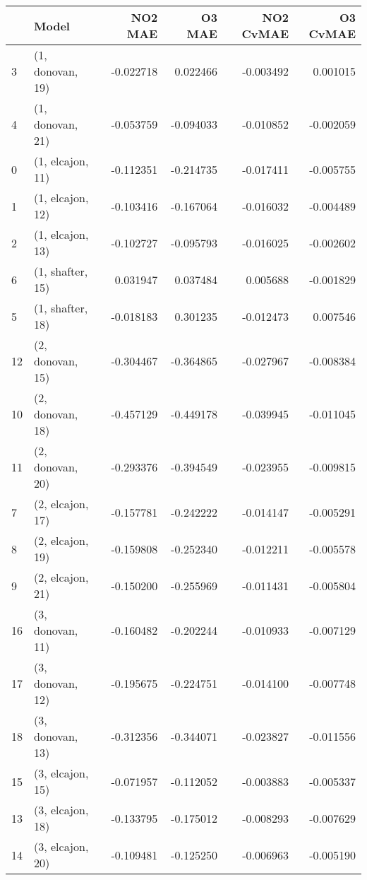\begin{tabular}{llrrrr}
\toprule
{} &             Model &   NO2 MAE &    O3 MAE &  NO2 CvMAE &  O3 CvMAE \\
\midrule
3  &  (1, donovan, 19) & -0.022718 &  0.022466 &  -0.003492 &  0.001015 \\
4  &  (1, donovan, 21) & -0.053759 & -0.094033 &  -0.010852 & -0.002059 \\
0  &  (1, elcajon, 11) & -0.112351 & -0.214735 &  -0.017411 & -0.005755 \\
1  &  (1, elcajon, 12) & -0.103416 & -0.167064 &  -0.016032 & -0.004489 \\
2  &  (1, elcajon, 13) & -0.102727 & -0.095793 &  -0.016025 & -0.002602 \\
6  &  (1, shafter, 15) &  0.031947 &  0.037484 &   0.005688 & -0.001829 \\
5  &  (1, shafter, 18) & -0.018183 &  0.301235 &  -0.012473 &  0.007546 \\
12 &  (2, donovan, 15) & -0.304467 & -0.364865 &  -0.027967 & -0.008384 \\
10 &  (2, donovan, 18) & -0.457129 & -0.449178 &  -0.039945 & -0.011045 \\
11 &  (2, donovan, 20) & -0.293376 & -0.394549 &  -0.023955 & -0.009815 \\
7  &  (2, elcajon, 17) & -0.157781 & -0.242222 &  -0.014147 & -0.005291 \\
8  &  (2, elcajon, 19) & -0.159808 & -0.252340 &  -0.012211 & -0.005578 \\
9  &  (2, elcajon, 21) & -0.150200 & -0.255969 &  -0.011431 & -0.005804 \\
16 &  (3, donovan, 11) & -0.160482 & -0.202244 &  -0.010933 & -0.007129 \\
17 &  (3, donovan, 12) & -0.195675 & -0.224751 &  -0.014100 & -0.007748 \\
18 &  (3, donovan, 13) & -0.312356 & -0.344071 &  -0.023827 & -0.011556 \\
15 &  (3, elcajon, 15) & -0.071957 & -0.112052 &  -0.003883 & -0.005337 \\
13 &  (3, elcajon, 18) & -0.133795 & -0.175012 &  -0.008293 & -0.007629 \\
14 &  (3, elcajon, 20) & -0.109481 & -0.125250 &  -0.006963 & -0.005190 \\
\bottomrule
\end{tabular}

